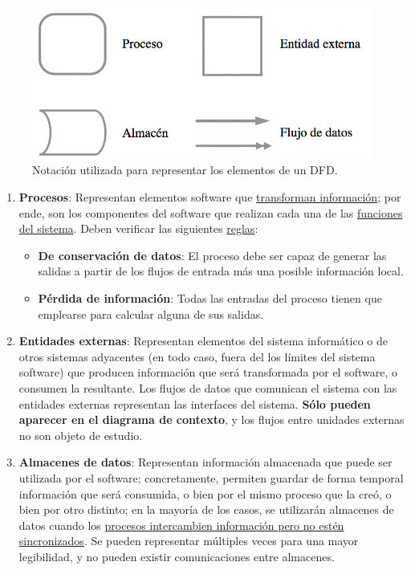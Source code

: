 \begin{figure}[H]
    \centering
    \includegraphics[width=0.5\linewidth]{Resources/Tema5/elementosDFD.jpg}
    \caption{Notación utilizada para representar los elementos de un DFD.}
    \label{fig:elementosDFD}
\end{figure}
\begin{enumerate}
    \item \textbf{Procesos}: Representan elementos software que \uline{transforman información}; por ende, son los componentes del software que realizan cada una de las \uline{funciones del sistema}. Deben verificar las siguientes \uline{reglas}:
    \begin{itemize}
        \item \textbf{De conservación de datos}: El proceso debe ser capaz de generar las salidas a partir de los flujos de entrada más una posible información local.
        \item \textbf{Pérdida de información}: Todas las entradas del proceso tienen que emplearse para calcular alguna de sus salidas.
    \end{itemize}

    \item \textbf{Entidades externas}: Representan elementos del sistema informático o de otros sistemas adyacentes (en todo caso, fuera del los límites del sistema software) que producen información que será transformada por el software, o consumen la resultante. Los flujos de datos que comunican el sistema con las entidades externas representan las interfaces del sistema. \textbf{Sólo pueden aparecer en el diagrama de contexto}, y los flujos entre unidades externas no son objeto de estudio.

    \item \textbf{Almacenes de datos}: Representan información almacenada que puede ser utilizada por el software; concretamente, permiten guardar de forma temporal información que será consumida, o bien por el mismo proceso que la creó, o bien por otro distinto; en la mayoría de los casos, se utilizarán almacenes de datos cuando los \uline{procesos intercambien información pero no estén sincronizados}. Se pueden representar múltiples veces para una mayor legibilidad, y no pueden existir comunicaciones entre almacenes.


\end{enumerate}

